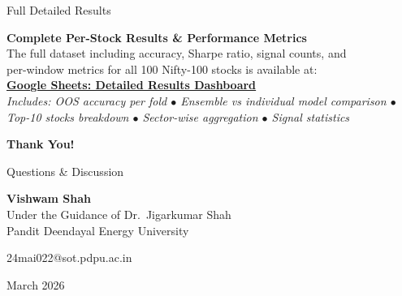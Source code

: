 \documentclass[aspectratio=43,11pt]{beamer}
\begin{document}
\begin{frame}{Full Detailed Results}
    \begin{center}
        \large\textbf{Complete Per-Stock Results \& Performance Metrics}\\[0.5cm]
        \normalsize
        The full dataset including accuracy, Sharpe ratio, signal counts, and\\
        per-window metrics for all 100 Nifty-100 stocks is available at:\\[0.6cm]
        \href{https://docs.google.com/spreadsheets/d/1APP9bvHU6tJ27F7QghFE-6eITIAy3sV7/edit?usp=drive_link&ouid=106713561251568027774&rtpof=true&sd=true}{%
            \textcolor{primaryblue}{\underline{\textbf{Google Sheets: Detailed Results Dashboard}}}%
        }\\[0.5cm]
        \footnotesize
        \textit{Includes: OOS accuracy per fold $\bullet$ Ensemble vs individual model comparison $\bullet$\\
        Top-10 stocks breakdown $\bullet$ Sector-wise aggregation $\bullet$ Signal statistics}
    \end{center}
\end{frame}

\begin{frame}
    \begin{center}
        \Huge \textbf{Thank You!}
        \vspace{0.8cm}

        \Large Questions \& Discussion
        \vspace{0.8cm}

        \normalsize
        \textbf{Vishwam Shah}\\[0.15cm]
        Under the Guidance of Dr.~Jigarkumar Shah\\[0.15cm]
        Pandit Deendayal Energy University
        \vspace{0.4cm}

        \textcolor{primaryblue}{24mai022@sot.pdpu.ac.in}
        \vspace{0.6cm}

        \small March 2026
    \end{center}
\end{frame}

\appendix
\end{document}
